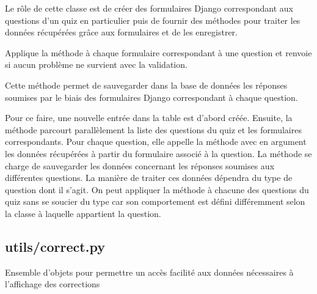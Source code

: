 \documentclass[a4paper,11pt,openany,oneside]{sphinxmanual}
\begin{document}
\begin{fulllineitems}
\label{source:quiz.utils.submit.QuizForms}
Le rôle de cette classe est de créer des formulaires Django correspondant aux
questions d'un quiz en particulier puis de fournir des méthodes pour traiter
les données récupérées grâce aux formulaires et de les enregistrer.

\begin{fulllineitems}
\label{source:quiz.utils.submit.QuizForms.are_valid}
Applique la méthode  à chaque formulaire correspondant à une
question et renvoie  si aucun problème ne survient avec la validation.

\end{fulllineitems}


\begin{fulllineitems}
\label{source:quiz.utils.submit.QuizForms.save_answers}
Cette méthode permet de sauvegarder dans la base de données les réponses
soumises par le biais des formulaires Django correspondant à chaque question.

Pour ce faire, une nouvelle entrée dans la table  est
d'abord créée. Ensuite, la méthode parcourt parallèlement la liste des questions
du quiz et les formulaires correspondants. Pour chaque question, elle appelle
la méthode  avec en argument les données récupérées à partir
du formulaire associé à la question. La méthode  se charge
de sauvegarder les données concernant les réponses soumises aux différentes
questions. La manière de traiter ces données dépendra du type de question
dont il s'agit. On peut appliquer la méthode  à chacune
des questions du quiz sans se soucier du type car son comportement est défini
différemment selon la classe à laquelle appartient la question.

\end{fulllineitems}


\end{fulllineitems}



\subsection{utils/correct.py}
\label{source:module-quiz.utils.correct}\label{source:utils-correct-py}
Ensemble d'objets pour permettre un accès facilité aux données nécessaires à
l'affichage des corrections
\end{document}
